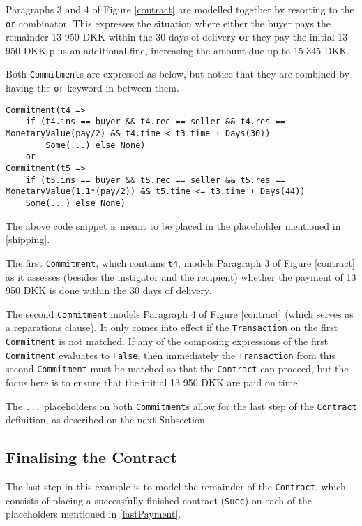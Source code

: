 \documentclass{ituthesis}
\begin{document}
Paragraphs 3 and 4 of Figure \ref{contract} are modelled together by resorting to the \texttt{or} combinator. This expresses the situation where either the buyer pays the remainder 13 950 DKK within the 30 days of delivery \textbf{or} they pay the initial 13 950 DKK plus an additional fine, increasing the amount due up to 15 345 DKK.

Both \texttt{Commitment}s are expressed as below, but notice that they are combined by having the \texttt{or} keyword in between them.
\begin{lstlisting}
Commitment(t4 =>
    if (t4.ins == buyer && t4.rec == seller && t4.res == MonetaryValue(pay/2) && t4.time < t3.time + Days(30))
		Some(...) else None)
    or
Commitment(t5 => 
    if (t5.ins == buyer && t5.rec == seller && t5.res == MonetaryValue(1.1*(pay/2)) && t5.time <= t3.time + Days(44))
    Some(...) else None)
\end{lstlisting}
The above code snippet is meant to be placed in the placeholder mentioned in \ref{shipping}.

The first \texttt{Commitment}, which contains \texttt{t4}, models Paragraph 3 of Figure \ref{contract} as it assesses (besides the instigator and the recipient) whether the payment of 13 950 DKK is done within the 30 days of delivery.

The second \texttt{Commitment} models Paragraph 4 of Figure \ref{contract} (which serves as a reparations clause). It only comes into effect if the \texttt{Transaction} on the first \texttt{Commitment} is not matched. If any of the composing expressions of the first \texttt{Commitment} evaluates to \texttt{False}, then immediately the \texttt{Transaction} from this second \texttt{Commitment} must be matched so that the \texttt{Contract} can proceed, but the focus here is to ensure that the initial 13 950 DKK are paid on time.

The \texttt{...} placeholders on both \texttt{Commitment}s allow for the last step of the \texttt{Contract} definition, as described on the next Subsection.

\subsection{Finalising the Contract} \label{finalizingContract}

The last step in this example is to model the remainder of the \texttt{Contract}, which consists of placing a successfully finished contract (\texttt{Succ}) on each of the placeholders mentioned in \ref{lastPayment}.
\end{document}
